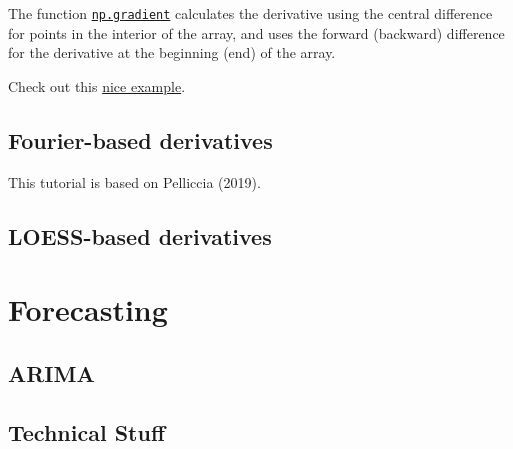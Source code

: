 \documentclass[
  letterpaper,
  DIV=11,
  numbers=noendperiod,
  oneside]{scrreprt}
\begin{document}
The function
\href{https://numpy.org/doc/stable/reference/generated/numpy.gradient.html}{\texttt{np.gradient}}
calculates the derivative using the central difference for points in the
interior of the array, and uses the forward (backward) difference for
the derivative at the beginning (end) of the array.


Check out this
\href{https://gist.github.com/astrojuanlu/e4d47fec5d94d2224762a61680419eb2}{nice
example}.

\hypertarget{fourier-based-derivatives}{%
\chapter{Fourier-based derivatives}\label{fourier-based-derivatives}}

This tutorial is based on Pelliccia (2019).

\hypertarget{loess-based-derivatives}{%
\chapter{LOESS-based derivatives}\label{loess-based-derivatives}}

\part{Forecasting}

\hypertarget{arima}{%
\chapter{ARIMA}\label{arima}}


\hypertarget{technical-stuff}{%
\chapter*{Technical Stuff}\label{technical-stuff}}

\end{document}
